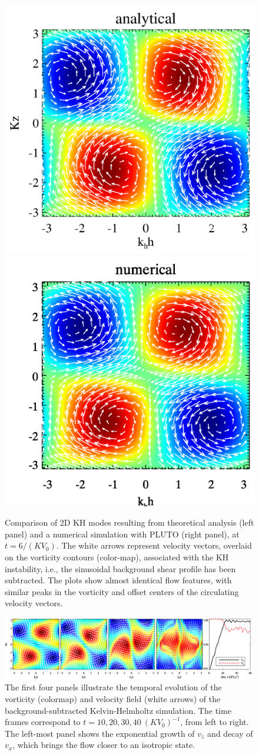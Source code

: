 \documentclass[]{emulateapj}
\begin{document}
\begin{figure}[t]
\begin{center}
\includegraphics[width= 0.49\columnwidth]{f2.png}  
\includegraphics[width= 0.49\columnwidth]{f3.png}
\caption{
Comparison of 2D KH modes resulting from theoretical analysis (left
panel) and a numerical simulation with PLUTO (right panel), at $t=6{/(KV_0)}$.
The white arrows represent velocity vectors, overlaid on the vorticity
contours (color-map), associated with the KH instability, i.e., the
sinusoidal background shear profile has been subtracted.  The plots
show almost identical flow features, with similar peaks in the
vorticity and offset centers of the circulating velocity vectors.
}
\label{kh2danalytical_simcomparison_modes}
\end{center}
\end{figure}

\begin{figure}[thbp]
\begin{center}
\includegraphics[width=0.99\textwidth]{f4.png}
\caption{
The first four panels illustrate the temporal evolution of the vorticity (colormap) and velocity field 
(white arrows) of the background-subtracted Kelvin-Helmholtz simulation. The time frames 
correspond to $t=10,20,30,40 ~(KV_0)^{-1} $, from left to right. The left-most panel shows the 
exponential growth of $v_z$ and decay of $v_{x}$, which brings the flow closer to an isotropic state.
}
\label{fig:khnonlin}
\end{center}
\end{figure}
\end{document}
